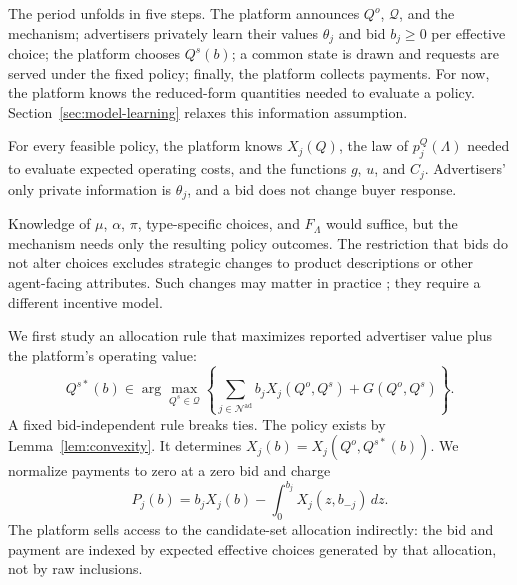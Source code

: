 \documentclass[opre,dblanonrev]{informs4}
\providecommand{\1}{\mathbf{1}}
\begin{document}
The period unfolds in five steps. The platform announces $Q^o$, $\mathcal Q$, and the mechanism; advertisers privately learn their values $\theta_j$ and bid $b_j\ge0$ per effective choice; the platform chooses $Q^s(b)$; a common state is drawn and requests are served under the fixed policy; finally, the platform collects payments. For now, the platform knows the reduced-form quantities needed to evaluate a policy. Section~\ref{sec:model-learning} relaxes this information assumption.

\begin{assumption}\label{ass:known}
For every feasible policy, the platform knows $X_j(Q)$, the law of $p_j^Q(\Lambda)$ needed to evaluate expected operating costs, and the functions $g$, $u$, and $C_j$. Advertisers' only private information is $\theta_j$, and a bid does not change buyer response.
\end{assumption}

Knowledge of $\mu$, $\alpha$, $\pi$, type-specific choices, and $F_\Lambda$ would suffice, but the mechanism needs only the resulting policy outcomes. The restriction that bids do not alter choices excludes strategic changes to product descriptions or other agent-facing attributes. Such changes may matter in practice \citep{allouah2026your}; they require a different incentive model.

We first study an allocation rule that maximizes reported advertiser value plus the platform's operating value:
\begin{equation}\label{eq:alloc}
Q^{s\ast}(b)\in\arg\max_{Q^s\in\mathcal Q}
\left\{\sum_{j\in\mathcal N^{\mathrm{ad}}}b_jX_j(Q^o,Q^s)+G(Q^o,Q^s)\right\}.
\end{equation}
A fixed bid-independent rule breaks ties. The policy exists by Lemma~\ref{lem:convexity}. It determines $X_j(b)=X_j(Q^o,Q^{s\ast}(b))$. We normalize payments to zero at a zero bid and charge
\begin{equation}\label{eq:payment}
P_j(b)=b_jX_j(b)-\int_0^{b_j}X_j(z,b_{-j})\,dz.
\end{equation}
The platform sells access to the candidate-set allocation indirectly: the bid and payment are indexed by expected effective choices generated by that allocation, not by raw inclusions.
\end{document}
